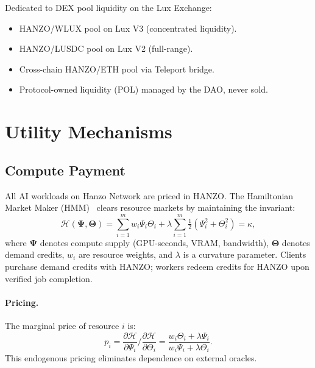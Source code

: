 \documentclass[11pt]{article}
\begin{document}
Dedicated to DEX pool liquidity on the Lux Exchange:

\begin{itemize}[leftmargin=1.1em]
    \item HANZO/WLUX pool on Lux V3 (concentrated liquidity).
    \item HANZO/LUSDC pool on Lux V2 (full-range).
    \item Cross-chain HANZO/ETH pool via Teleport bridge.
    \item Protocol-owned liquidity (POL) managed by the DAO, never sold.
\end{itemize}

\section{Utility Mechanisms}
\label{sec:utility}

\subsection{Compute Payment}
\label{sec:compute}

All AI workloads on Hanzo Network are priced in HANZO. The Hamiltonian Market
Maker (HMM)~\cite{hanzonetwork} clears resource markets by maintaining the
invariant:
\begin{equation}
\mathcal{H}(\bm{\Psi}, \bm{\Theta}) = \sum_{i=1}^{m} w_i \Psi_i \Theta_i +
\lambda \sum_{i=1}^{m} \tfrac{1}{2}(\Psi_i^2 + \Theta_i^2) = \kappa,
\end{equation}
where $\bm{\Psi}$ denotes compute supply (GPU-seconds, VRAM, bandwidth),
$\bm{\Theta}$ denotes demand credits, $w_i$ are resource weights, and $\lambda$
is a curvature parameter. Clients purchase demand credits with HANZO; workers
redeem credits for HANZO upon verified job completion.

\paragraph{Pricing.} The marginal price of resource $i$ is:
\begin{equation}
p_i = \frac{\partial \mathcal{H}}{\partial \Psi_i} \Big/
\frac{\partial \mathcal{H}}{\partial \Theta_i} =
\frac{w_i \Theta_i + \lambda \Psi_i}{w_i \Psi_i + \lambda \Theta_i}.
\end{equation}
This endogenous pricing eliminates dependence on external oracles.
\end{document}
